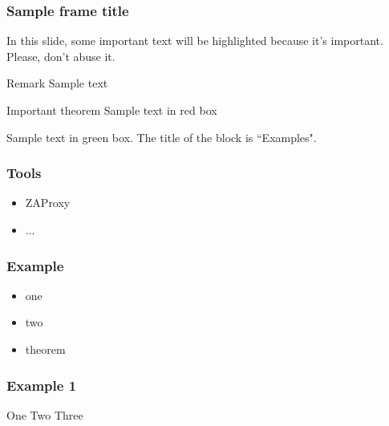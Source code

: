 \documentclass[aspectratio=169]{beamer}
\begin{document}
\begin{frame}
    \frametitle{Sample frame title}
    
    In this slide, some important text will be
    \alert{highlighted} because it's important.
    Please, don't abuse it.
    
    \begin{block}{Remark}
    Sample text
    \end{block}
    
    \begin{alertblock}{Important theorem}
    Sample text in red box
    \end{alertblock}
    
    \begin{examples}
    Sample text in green box. The title of the block is ``Examples".
    \end{examples}

\end{frame}

\begin{frame}
    \frametitle{Tools}
    \begin{itemize}
        \item ZAProxy
        \item ...
    \end{itemize}
\end{frame}


\begin{frame}
    \frametitle{Example}

    \begin{itemize}
        \item<1-> one
        \item<2-> two
        \item<3-> theorem
    \end{itemize}

\end{frame}

\begin{frame}
    \frametitle{Example 1}
    One \pause
    Two \pause
    Three
\end{frame}
\end{document}
